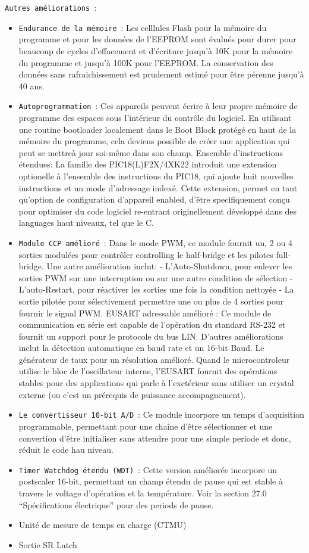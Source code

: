 \documentclass[a4paper, 12pt]{book}
\newcounter{program}[subsection]
\begin{document}
\texttt{Autres améliorations}~:
\begin{itemize}
\item \texttt{Endurance de la mémoire}~:
Les celllules Flash pour la mémoire du programme et pour les données de l’EEPROM sont évalués pour durer pour beaucoup de cycles d’effacement et d’écriture jusqu’à 10K pour la mémoire du programme et jusqu’à 100K pour l’EEPROM. La conservation des données sans rafraichissement est prudement estimé pour être pérenne jusqu’à 40 ans.
\item \texttt{Autoprogrammation}~:
Ces appareils peuvent écrire à leur propre mémoire de programme des espaces sous l’intérieur du contrôle du logiciel. En utilisant une routine bootloader localement dans le Boot Block protégé en haut de la mémoire du programme, cela deviens possible de créer une application qui peut se mettreà jour soi-même dans son champ.
Ensemble d’instructions étendues:
La famille des PIC18(L)F2X/4XK22 introduit une extension optionelle à l’ensemble des instructions du PIC18, qui ajoute huit nouvelles instructions et un mode d’adressage indexé.
Cette extension, permet en tant qu’option de configuration d’appareil enabled, d’être specifiquement conçu pour optimiser du code logiciel re-entrant originellement développé dans des languages haut niveaux, tel que le C.
\item \texttt{Module CCP amélioré}~:
Dans le mode PWM, ce module fournit un, 2 ou 4 sorties modulées pour contrôler controlling le half-bridge et les pilotes full-bridge. Une autre amélioration inclut:
- L’Auto-Shutdown, pour enlever les sorties PWM sur une interruption ou sur une autre condition de sélection
- L’auto-Restart, pour réactiver les sorties une fois la condition nettoyée
- La sortie pilotée pour sélectivement permettre une ou plus de 4 sorties pour fournir le signal PWM.
EUSART adressable amélioré :
Ce module de communication en série est capable de l’opération du standard RS-232 et fournit un support pour le protocole du bus LIN. D’autres améliorations inclut la détection automatique en baud rate et un 16-bit Baud.
Le générateur de taux pour un résolution amélioré. Quand le microcontroleur utilise le bloc de l’oscillateur interne, l’EUSART fournit des opérations stables pour des applications qui parle à l’exctérieur sans utiliser
un crystal externe (ou c’est un prérequis de puissance accompagnement).
\item \texttt{Le convertisseur 10-bit A/D}~:
Ce module incorpore un temps d’acquisition programmable, permettant pour une chaîne d’être sélectionner et une convertion d’être initialiser sans attendre pour une simple periode et donc, réduit le code hau niveau.
\item \texttt{Timer Watchdog étendu (WDT)}~:
Cette version améliorée incorpore un postscaler 16-bit, permettant un champ étendu de pause qui est stable à travers le voltage d’opération et la température. Voir la section 27.0 “Spécifications électrique” pour des periods de pause.
\item Unité de mesure de temps en charge (CTMU)
\item Sortie SR Latch\\
\end{itemize}
\end{document}
